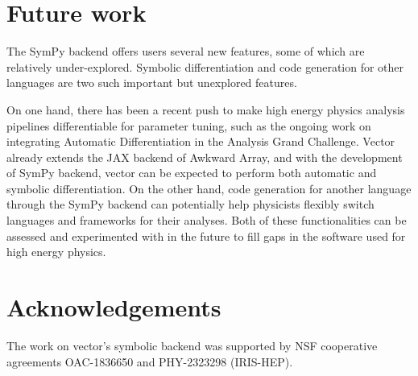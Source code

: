 \documentclass{webofc}
\begin{document}
\section{Future work}
\label{sec-future-work}

The SymPy backend offers users several new features, some of which are relatively under-explored. Symbolic differentiation and code generation for other languages are two such important but unexplored features.

On one hand, there has been a recent push to make high energy physics analysis pipelines differentiable for parameter tuning, such as the ongoing work on integrating Automatic Differentiation in the Analysis Grand Challenge. Vector already extends the JAX backend of Awkward Array, and with the development of SymPy backend, vector can be expected to perform both automatic and symbolic differentiation. On the other hand, code generation for another language through the SymPy backend can potentially help physicists flexibly switch languages and frameworks for their analyses. Both of these functionalities can be assessed and experimented with in the future to fill gaps in the software used for high energy physics.

\section{Acknowledgements}
\label{sec-acknowledgements}

The work on vector's symbolic backend was supported by NSF cooperative agreements OAC-1836650 and PHY-2323298 (IRIS-HEP).


\end{document}
